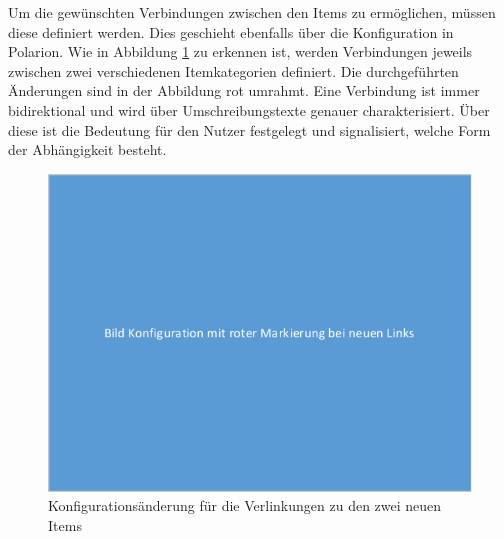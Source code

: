 \documentclass[a4paper,12pt]{report}
\begin{document}
Um die gewünschten Verbindungen zwischen den Items zu ermöglichen, müssen diese definiert werden. Dies geschieht ebenfalls über die Konfiguration in Polarion. Wie in Abbildung \ref{new_config_links} zu erkennen ist, werden Verbindungen jeweils zwischen zwei verschiedenen Itemkategorien definiert. Die durchgeführten Änderungen sind in der Abbildung rot umrahmt. Eine Verbindung ist immer bidirektional und wird über Umschreibungstexte genauer charakterisiert. Über diese ist die Bedeutung für den Nutzer festgelegt und signalisiert, welche Form der Abhängigkeit besteht. 
\begin{figure}[ht]
\centering
\includegraphics[width=1\textwidth]{Images/new_config_links}
\caption[Konfigurationsänderung für die Verlinkungen zu den zwei neuen Items]{Konfigurationsänderung für die Verlinkungen zu den zwei neuen Items}
\label{new_config_links}
\end{figure}
\end{document}
